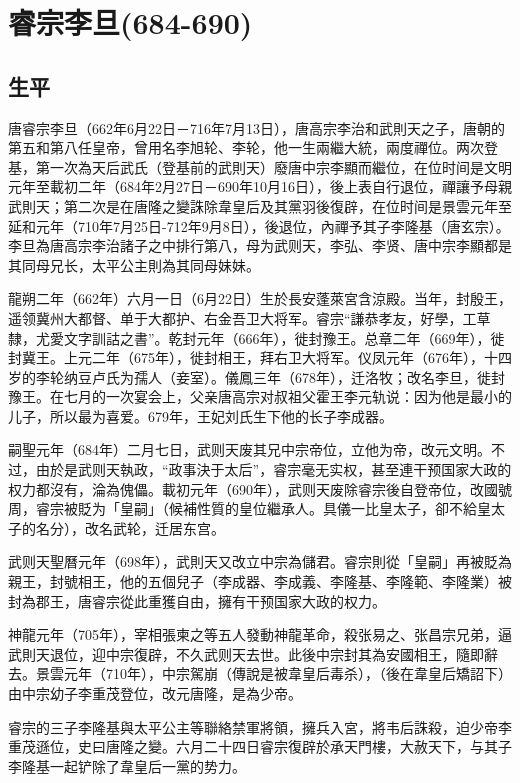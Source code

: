 
\section{睿宗李旦\tiny(684-690)}

\subsection{生平}

唐睿宗李旦（662年6月22日－716年7月13日），唐高宗李治和武則天之子，唐朝的第五和第八任皇帝，曾用名李旭轮、李轮，他一生兩繼大統，兩度禪位。两次登基，第一次為天后武氏（登基前的武則天）廢唐中宗李顯而繼位，在位时间是文明元年至載初二年（684年2月27日－690年10月16日），後上表自行退位，禪讓予母親武則天；第二次是在唐隆之變誅除韋皇后及其黨羽後復辟，在位时间是景雲元年至延和元年（710年7月25日-712年9月8日），後退位，內禪予其子李隆基（唐玄宗）。李旦為唐高宗李治諸子之中排行第八，母为武则天，李弘、李贤、唐中宗李顯都是其同母兄长，太平公主則為其同母妹妹。

龍朔二年（662年）六月一日（6月22日）生於長安蓬萊宮含涼殿。当年，封殷王，遥领冀州大都督、单于大都护、右金吾卫大将军。睿宗“謙恭孝友，好學，工草隸，尤愛文字訓詁之書”。乾封元年（666年），徙封豫王。总章二年（669年），徙封冀王。上元二年（675年），徙封相王，拜右卫大将军。仪凤元年（676年），十四岁的李轮纳豆卢氏为孺人（妾室）。儀鳳三年（678年），迁洛牧；改名李旦，徙封豫王。在七月的一次宴会上，父亲唐高宗对叔祖父霍王李元轨说：因为他是最小的儿子，所以最为喜爱。679年，王妃刘氏生下他的长子李成器。

嗣聖元年（684年）二月七日，武则天废其兄中宗帝位，立他为帝，改元文明。不过，由於是武则天執政，“政事決于太后”，睿宗毫无实权，甚至連干预国家大政的权力都沒有，淪為傀儡。載初元年（690年），武则天废除睿宗後自登帝位，改國號周，睿宗被貶为「皇嗣」（候補性質的皇位繼承人。具儀一比皇太子，卻不給皇太子的名分），改名武轮，迁居东宫。

武则天聖曆元年（698年），武則天又改立中宗為儲君。睿宗則從「皇嗣」再被貶為親王，封號相王，他的五個兒子（李成器、李成義、李隆基、李隆範、李隆業）被封為郡王，唐睿宗從此重獲自由，擁有干预国家大政的权力。

神龍元年（705年），宰相張柬之等五人發動神龍革命，殺张易之、张昌宗兄弟，逼武則天退位，迎中宗復辟，不久武则天去世。此後中宗封其為安國相王，隨即辭去。景雲元年（710年），中宗駕崩（傳說是被韋皇后毒杀），（後在韋皇后矯詔下）由中宗幼子李重茂登位，改元唐隆，是為少帝。

睿宗的三子李隆基與太平公主等聯絡禁軍將領，擁兵入宮，將韦后誅殺，迫少帝李重茂遜位，史曰唐隆之變。六月二十四日睿宗復辟於承天門樓，大赦天下，与其子李隆基一起铲除了韋皇后一黨的势力。

